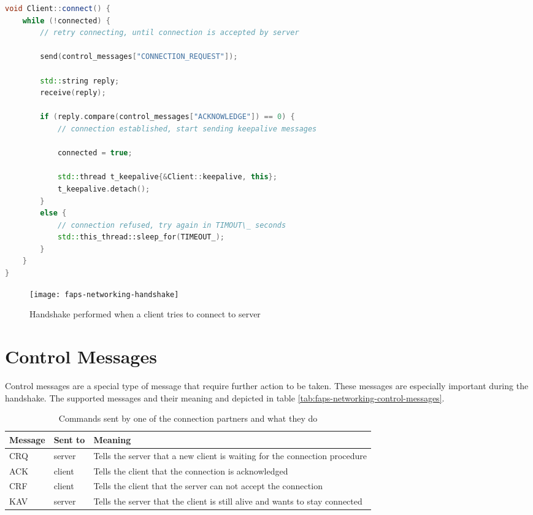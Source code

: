 \begin{minipage}{\linewidth}
\begin{lstlisting}[caption={Client handshake method}, label=lst:faps-networking-handshake-client, captionpos=b, language=C++]
void Client::connect() {
    while (!connected) {
        // retry connecting, until connection is accepted by server

        send(control_messages["CONNECTION_REQUEST"]);

        std::string reply;
        receive(reply);

        if (reply.compare(control_messages["ACKNOWLEDGE"]) == 0) {
            // connection established, start sending keepalive messages

            connected = true;

            std::thread t_keepalive{&Client::keepalive, this};
            t_keepalive.detach();
        }
        else {
            // connection refused, try again in TIMOUT\_ seconds
            std::this_thread::sleep_for(TIMEOUT_);
        }
    }
}
\end{lstlisting}
\end{minipage}

\begin{figure}[H]
    \centering
    \texttt{[image: faps-networking-handshake]}
    \caption{Handshake performed when a client tries to connect to server}
    \label{fig:faps-networking-handshake}
\end{figure}

\section{Control Messages}

Control messages are a special type of message that require further action to be taken. These messages are especially important during the handshake. The supported messages and their meaning and depicted in table \vref{tab:faps-networking-control-messages}.

\begin{table}[H]
    \centering
    \begin{tabular}{| l | l | p{5cm} |}
    \hline
    \textbf{Message} & \textbf{Sent to} & \textbf{Meaning} \\ \hline
    CRQ & server & Tells the server that a new client is waiting for the connection procedure \\ \hline
    ACK & client & Tells the client that the connection is acknowledged \\ \hline
    CRF & client & Tells the client that the server can not accept the connection \\ \hline
    KAV & server & Tells the server that the client is still alive and wants to stay connected \\
    \hline
    \end{tabular}
    \caption{Commands sent by one of the connection partners and what they do}
    \label{tab:faps-networking-control-messages}
\end{table}

